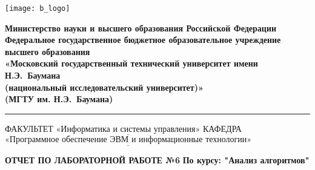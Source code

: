 


\noindent \begin{minipage}{0.15\textwidth}
	\texttt{[image: b\_logo]}
\end{minipage}
\noindent\begin{minipage}{0.9\textwidth}\centering
	\textbf{Министерство науки и высшего образования Российской Федерации}\\
	\textbf{Федеральное государственное бюджетное образовательное учреждение высшего образования}\\
	\textbf{«Московский государственный технический университет имени Н.Э.~Баумана}\\
	\textbf{(национальный исследовательский университет)»}\\
	\textbf{(МГТУ им. Н.Э.~Баумана)}
\end{minipage}

\noindent\rule{18cm}{3pt}
\newline
\noindent ФАКУЛЬТЕТ $\underline{\text{«Информатика и системы управления»}}$ \newline
\noindent КАФЕДРА $\underline{\text{«Программное обеспечение ЭВМ и информационные технологии»}}$\newline


\begin{center}
	\noindent\begin{minipage}{1.2\textwidth}\centering
		\textbf{ОТЧЕТ ПО ЛАБОРАТОРНОЙ РАБОТЕ №6}\newline
		\textbf{По курсу: "Анализ алгоритмов"}\newline\newline\newline
	\end{minipage}
\end{center}




